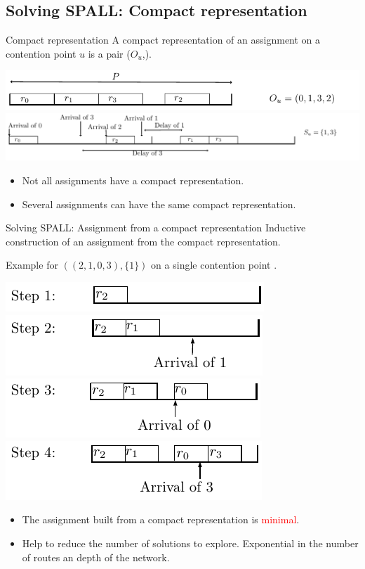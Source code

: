 \documentclass[10 pt]{beamer}
\begin{document}
\subsection{Solving SPALL: Compact representation}
\begin{frame}{Compact representation}
A compact representation of an assignment on a contention point $u$ is a pair ($O_u$,).

	\includegraphics[width=0.65\linewidth]{order}
  \pause
  \includegraphics[width=\linewidth]{subset}


\pause
\begin{itemize}
  \item Not all assignments have a compact representation.
  \pause
  \item Several assignments can have the same compact representation.
  \end{itemize}
\end{frame}
\begin{frame}{Solving SPALL: Assignment from a compact representation }
Inductive construction of an assignment from the compact representation. 

Example for $((2,1,0,3),\{1\})$ on a single contention point .


	\includegraphics[width=0.5\linewidth]{compacttoassignment1}
\pause
\includegraphics[width=0.5\linewidth]{compacttoassignment2}
\pause
\includegraphics[width=0.5\linewidth]{compacttoassignment3}
\pause
\includegraphics[width=0.5\linewidth]{compacttoassignment4}
\pause

\begin{itemize}
  \item The assignment built from a compact representation is \textcolor{red}{minimal}.
  \pause

  \item Help to reduce the number of solutions to explore. Exponential in the number of routes an depth of the network.
  \end{itemize}
\end{frame}
\end{document}
